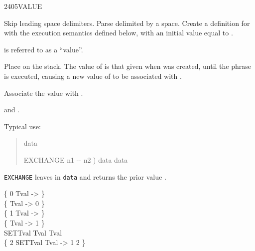 \begin{worddef}{2405}{VALUE}
\item {}

	Skip leading space delimiters. Parse  delimited by
	a space. Create a definition for  with the execution
	semantics defined below, with an initial value equal to .

	 is referred to as a ``value''.

\execute[name]

	Place  on the stack. The value of  is that
	given when  was created, until the phrase 
	  is executed, causing a new value of
	 to be associated with .


	Associate the value  with .

\see {}
	and .

	\begin{defer}
	\rationale %
		Typical use:
		\begin{quote}  data

			\word{:} EXCHANGE  n1 -{}- n2 )
				data   data
			\word{;}
		\end{quote}
		\texttt{EXCHANGE} leaves  in \texttt{data} and
		returns the prior value .

	\testing
		\{ 0  Tval -> \} \\
		\{ Tval -> 0 \} \\

		\{ 1  Tval -> \} \\
		\{ Tval -> 1 \} \\

		\word{:} SETTval Tval   Tval \word{;} \\
		\{ 2 SETTval Tval -> 1 2 \}
	\end{defer}
\end{worddef}


